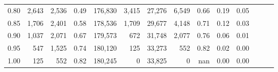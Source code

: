 \begin{tabular}{rrrrrrrrrrrrrr}
0.80 &   2,643 &  2,536 &  0.49 &  176,830 &    3,415 &  27,276 &   6,549 &  0.66 &  0.19 &      0.05 \\
0.85 &   1,706 &  2,401 &  0.58 &  178,536 &    1,709 &  29,677 &   4,148 &  0.71 &  0.12 &      0.03 \\
0.90 &   1,037 &  2,071 &  0.67 &  179,573 &      672 &  31,748 &   2,077 &  0.76 &  0.06 &      0.01 \\
0.95 &     547 &  1,525 &  0.74 &  180,120 &      125 &  33,273 &     552 &  0.82 &  0.02 &      0.00 \\
1.00 &     125 &    552 &  0.82 &  180,245 &        0 &  33,825 &       0 &   nan &  0.00 &      0.00 \\
\bottomrule
\end{tabular}
